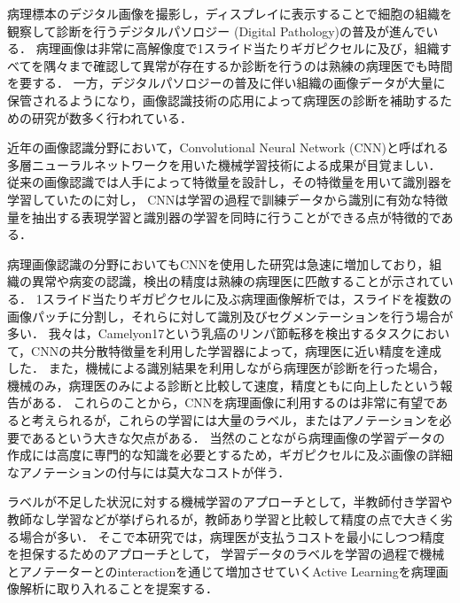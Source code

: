 
病理標本のデジタル画像を撮影し，ディスプレイに表示することで細胞の組織を観察して診断を行うデジタルパソロジー (Digital Pathology)の普及が進んでいる．
病理画像は非常に高解像度で1スライド当たりギガピクセルに及び，組織すべてを隅々まで確認して異常が存在するか診断を行うのは熟練の病理医でも時間を要する．
一方，デジタルパソロジーの普及に伴い組織の画像データが大量に保管されるようになり，画像認識技術の応用によって病理医の診断を補助するための研究が数多く行われている．


近年の画像認識分野において，Convolutional Neural Network (CNN)と呼ばれる多層ニューラルネットワークを用いた機械学習技術による成果が目覚ましい．
従来の画像認識では人手によって特徴量を設計し，その特徴量を用いて識別器を学習していたのに対し，
CNNは学習の過程で訓練データから識別に有効な特徴量を抽出する表現学習と識別器の学習を同時に行うことができる点が特徴的である．

病理画像認識の分野においてもCNNを使用した研究は急速に増加しており，組織の異常や病変の認識，検出の精度は熟練の病理医に匹敵することが示されている．
1スライド当たりギガピクセルに及ぶ病理画像解析では，スライドを複数の画像パッチに分割し，それらに対して識別及びセグメンテーションを行う場合が多い．
我々は，Camelyon17という乳癌のリンパ節転移を検出するタスクにおいて，CNNの共分散特徴量を利用した学習器によって，病理医に近い精度を達成した．
また，機械による識別結果を利用しながら病理医が診断を行った場合，機械のみ，病理医のみによる診断と比較して速度，精度ともに向上したという報告がある．
これらのことから，CNNを病理画像に利用するのは非常に有望であると考えられるが，これらの学習には大量のラベル，またはアノテーションを必要であるという大きな欠点がある．
当然のことながら病理画像の学習データの作成には高度に専門的な知識を必要とするため，ギガピクセルに及ぶ画像の詳細なアノテーションの付与には莫大なコストが伴う．

ラベルが不足した状況に対する機械学習のアプローチとして，半教師付き学習や教師なし学習などが挙げられるが，教師あり学習と比較して精度の点で大きく劣る場合が多い．
そこで本研究では，病理医が支払うコストを最小にしつつ精度を担保するためのアプローチとして，
学習データのラベルを学習の過程で機械とアノテーターとのinteractionを通じて増加させていくActive Learningを病理画像解析に取り入れることを提案する．


